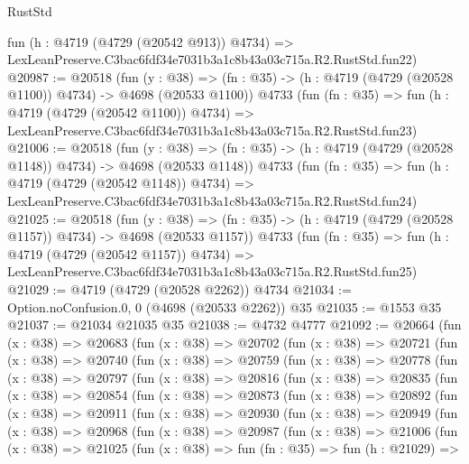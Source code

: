 \begin{lexlean}{RustStd}
\begin{coremodule}
    fun (h : @4719 (@4729 (@20542 @913)) @4734) =>
    LexLeanPreserve.C3bac6fdf34e7031b3a1c8b43a03c715a.R2.RustStd.fun22)
@20987 := @20518
    (fun (y : @38) =>
    (fn : @35) -> (h : @4719 (@4729 (@20528 @1100)) @4734) -> @4698 (@20533 @1100))
    @4733
    (fun (fn : @35) =>
    fun (h : @4719 (@4729 (@20542 @1100)) @4734) =>
    LexLeanPreserve.C3bac6fdf34e7031b3a1c8b43a03c715a.R2.RustStd.fun23)
@21006 := @20518
    (fun (y : @38) =>
    (fn : @35) -> (h : @4719 (@4729 (@20528 @1148)) @4734) -> @4698 (@20533 @1148))
    @4733
    (fun (fn : @35) =>
    fun (h : @4719 (@4729 (@20542 @1148)) @4734) =>
    LexLeanPreserve.C3bac6fdf34e7031b3a1c8b43a03c715a.R2.RustStd.fun24)
@21025 := @20518
    (fun (y : @38) =>
    (fn : @35) -> (h : @4719 (@4729 (@20528 @1157)) @4734) -> @4698 (@20533 @1157))
    @4733
    (fun (fn : @35) =>
    fun (h : @4719 (@4729 (@20542 @1157)) @4734) =>
    LexLeanPreserve.C3bac6fdf34e7031b3a1c8b43a03c715a.R2.RustStd.fun25)
@21029 := @4719 (@4729 (@20528 @2262)) @4734
@21034 := Option.noConfusion.{0, 0} (@4698 (@20533 @2262)) @35
@21035 := @1553 @35
@21037 := @21034 @21035 @35
@21038 := @4732 @4777
@21092 := @20664
    (fun (x : @38) =>
    @20683
      (fun (x : @38) =>
      @20702
        (fun (x : @38) =>
        @20721
          (fun (x : @38) =>
          @20740
            (fun (x : @38) =>
            @20759
              (fun (x : @38) =>
              @20778
                (fun (x : @38) =>
                @20797
                  (fun (x : @38) =>
                  @20816
                    (fun (x : @38) =>
                    @20835
                      (fun (x : @38) =>
                      @20854
                        (fun (x : @38) =>
                        @20873
                          (fun (x : @38) =>
                          @20892
                            (fun (x : @38) =>
                            @20911
                              (fun (x : @38) =>
                              @20930
                                (fun (x : @38) =>
                                @20949
                                  (fun (x : @38) =>
                                  @20968
                                    (fun (x : @38) =>
                                    @20987
                                      (fun (x : @38) =>
                                      @21006
                                        (fun (x : @38) =>
                                        @21025
                                          (fun (x : @38) =>
                                          fun (fn : @35) =>
                                          fun (h : @21029) =>

\end{coremodule}
\end{lexlean}
